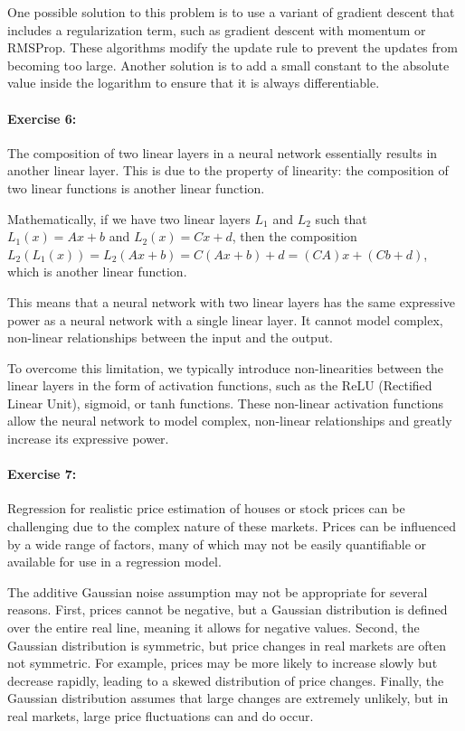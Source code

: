 One possible solution to this problem is to use a variant of gradient descent that includes a regularization term, such as gradient descent with momentum or RMSProp.
These algorithms modify the update rule to prevent the updates from becoming too large.
Another solution is to add a small constant to the absolute value inside the logarithm to ensure that it is always differentiable.


\paragraph{Exercise 6:}

The composition of two linear layers in a neural network essentially results in another linear layer. This is due to the property of linearity: the composition of two linear functions is another linear function.

Mathematically, if we have two linear layers \(L_1\) and \(L_2\) such that \(L_1(x) = Ax + b\) and \(L_2(x) = Cx + d\), then the composition \(L_2(L_1(x)) = L_2(Ax + b) = C(Ax + b) + d = (CA)x + (Cb + d)\), which is another linear function.

This means that a neural network with two linear layers has the same expressive power as a neural network with a single linear layer. It cannot model complex, non-linear relationships between the input and the output.

To overcome this limitation, we typically introduce non-linearities between the linear layers in the form of activation functions, such as the ReLU (Rectified Linear Unit), sigmoid, or tanh functions. These non-linear activation functions allow the neural network to model complex, non-linear relationships and greatly increase its expressive power.

\paragraph{Exercise 7:}

Regression for realistic price estimation of houses or stock prices can be challenging due to the complex nature of these markets. Prices can be influenced by a wide range of factors, many of which may not be easily quantifiable or available for use in a regression model.

The additive Gaussian noise assumption may not be appropriate for several reasons.
First, prices cannot be negative, but a Gaussian distribution is defined over the entire real line, meaning it allows for negative values.
Second, the Gaussian distribution is symmetric, but price changes in real markets are often not symmetric.
For example, prices may be more likely to increase slowly but decrease rapidly, leading to a skewed distribution of price changes.
Finally, the Gaussian distribution assumes that large changes are extremely unlikely, but in real markets, large price fluctuations can and do occur.

